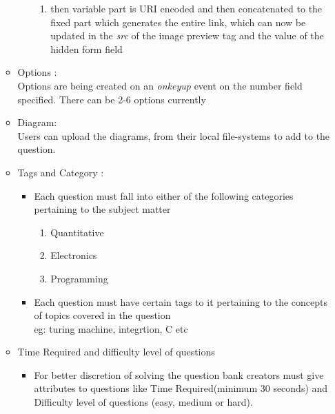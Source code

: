 \documentclass[a4paper,12pt,oneside]{book}
\begin{document}
\begin{enumerate}
\begin{itemize}
\begin{itemize}
\begin{enumerate}
                            \item then variable part is URI encoded and then concatenated to the fixed part which generates the entire link, which can now be updated in the \textit{src} of the image preview tag and the value of the hidden form field
                            
                            
                        \end{enumerate}
                \end{itemize}
                
            \item Options :\\
                Options are being created on an \textit{onkeyup} event on the number field specified. There can be 2-6 options currently
            
            \item Diagram: \\ 
                Users can upload the diagrams, from their local file-systems to add to the question.
            
            \item Tags and Category :
               \begin{itemize}
                    \item Each question must fall into either of the following categories pertaining to the subject matter
                    \begin{enumerate}
                        \item Quantitative 
                        \item Electronics 
                        \item Programming 
                    \end{enumerate}
                    
                    \item Each question must have certain tags to it pertaining to the concepts of topics covered in the question \\
                     eg: turing machine, integrtion, C etc
                    
               \end{itemize} 
               
            \item Time Required and difficulty level of questions 
                \begin{itemize}
                  \item For better discretion of solving the question bank creators must give attributes to questions like Time Required(minimum 30 seconds) and Difficulty level of questions (easy, medium or hard). 
                \end{itemize}
                

\end{itemize}
\end{enumerate}
\end{document}
